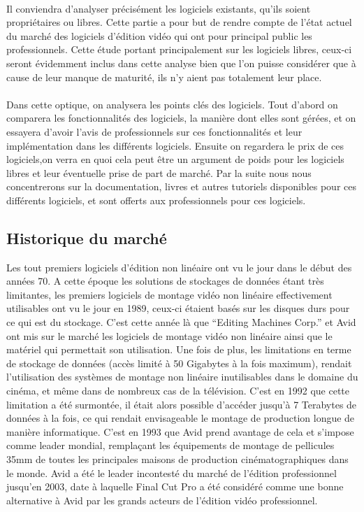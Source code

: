 \paragraph{}

Il conviendra d'analyser précisément les logiciels existants, qu'ils
soient propriétaires ou libres. Cette partie a pour but de rendre compte
de l'état actuel du marché des logiciels d'édition vidéo qui ont pour
principal public les professionnels. Cette étude portant principalement
sur les logiciels libres, ceux-ci seront évidemment inclus dans cette
analyse bien que l'on puisse considérer que à cause de leur manque de
maturité, ils n'y aient pas totalement leur place.

\paragraph{}

Dans cette optique, on analysera les points clés des logiciels.
Tout d'abord on comparera les fonctionnalités des logiciels, la
manière dont elles sont gérées, et on essayera d'avoir l'avis de
professionnels sur ces fonctionnalités et leur implémentation dans les
différents logiciels. Ensuite on regardera le prix de ces logiciels,on
verra en quoi cela peut être un argument de poids pour les logiciels
libres et leur éventuelle prise de part de marché. Par la suite nous
nous concentrerons sur la documentation, livres et autres tutoriels
disponibles pour ces différents logiciels, et %
sont offerts aux professionnels pour ces logiciels.

\subsection {Historique du marché}

Les tout premiers logiciels d'édition non linéaire ont vu le jour dans
le début des années 70.  A cette époque les solutions de stockages
de données étant très limitantes, les premiers logiciels de montage
vidéo non linéaire effectivement utilisables ont vu le jour en
1989, ceux-ci étaient basés sur les disques durs pour ce qui est du
stockage. C'est cette année là que ``Editing Machines Corp.'' et Avid
ont mis sur le marché les logiciels de montage vidéo non linéaire
ainsi que le matériel qui permettait son utilisation. Une fois de plus,
les limitations en terme de stockage de données (accès limité à
50 Gigabytes à la fois maximum), rendait l'utilisation des systèmes
de montage non linéaire inutilisables dans le domaine du cinéma,
et même dans de nombreux cas de la télévision. C'est en 1992 que
cette limitation a été surmontée, il était alors possible d'accéder
jusqu'à 7 Terabytes de données à la fois, ce qui rendait envisageable
le montage de production longue de manière informatique. C'est en
1993 que Avid prend avantage de cela et s'impose comme leader mondial,
remplaçant les équipements de montage de pellicules 35mm de toutes
les principales maisons de production cinématographiques dans le
monde. Avid a été le leader incontesté du marché de l'édition
professionnel jusqu'en 2003, date à laquelle Final Cut Pro a été
considéré comme une bonne alternative à Avid par les grands acteurs
de l'édition vidéo professionnel.


